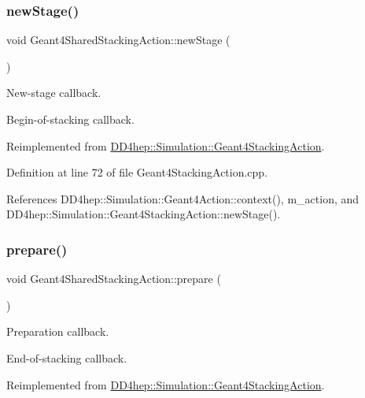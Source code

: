 \subsubsection{\texorpdfstring{new\+Stage()}{newStage()}}
{\footnotesize\ttfamily void Geant4\+Shared\+Stacking\+Action\+::new\+Stage (\begin{DoxyParamCaption}{ }\end{DoxyParamCaption})\hspace{0.3cm}{\ttfamily [virtual]}}



New-\/stage callback. 

Begin-\/of-\/stacking callback. 

Reimplemented from \hyperlink{class_d_d4hep_1_1_simulation_1_1_geant4_stacking_action_a2709ba86b13b0574dcd1d8e580209d0b}{D\+D4hep\+::\+Simulation\+::\+Geant4\+Stacking\+Action}.



Definition at line 72 of file Geant4\+Stacking\+Action.\+cpp.



References D\+D4hep\+::\+Simulation\+::\+Geant4\+Action\+::context(), m\+\_\+action, and D\+D4hep\+::\+Simulation\+::\+Geant4\+Stacking\+Action\+::new\+Stage().

\hypertarget{class_d_d4hep_1_1_simulation_1_1_geant4_shared_stacking_action_a22e3516dfed160da7a3b246d28098891}{}\label{class_d_d4hep_1_1_simulation_1_1_geant4_shared_stacking_action_a22e3516dfed160da7a3b246d28098891} 
\subsubsection{\texorpdfstring{prepare()}{prepare()}}
{\footnotesize\ttfamily void Geant4\+Shared\+Stacking\+Action\+::prepare (\begin{DoxyParamCaption}{ }\end{DoxyParamCaption})\hspace{0.3cm}{\ttfamily [virtual]}}



Preparation callback. 

End-\/of-\/stacking callback. 

Reimplemented from \hyperlink{class_d_d4hep_1_1_simulation_1_1_geant4_stacking_action_a3974c0e7b737bdccced8c196fc316b5b}{D\+D4hep\+::\+Simulation\+::\+Geant4\+Stacking\+Action}.



